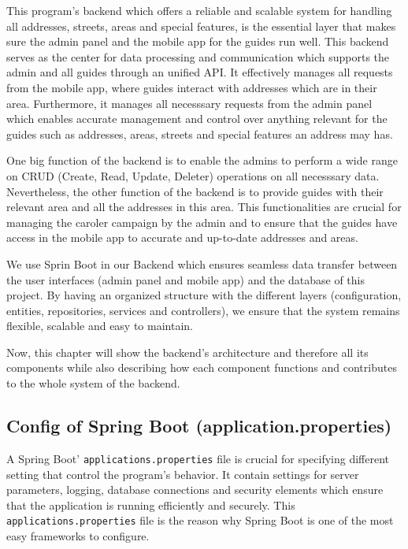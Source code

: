 \Author{\daAuthorThree}

    This program's backend which offers a reliable and scalable system for handling all addresses, streets, areas and special features, is the essential layer that makes sure the admin panel and the mobile app for the guides run well. \newline
    This backend serves as the center for data processing and communication which supports the admin and all guides through an unified API. \newline
    It effectively manages all requests from the mobile app, where guides interact with addresses which are in their area. Furthermore, it manages all necesssary requests from the admin panel which enables accurate management and control over anything relevant for the guides such as addresses, areas, streets and special features an address may has. \newline 

    One big function of the backend is to enable the admins to perform a wide range on CRUD (Create, Read, Update, Deleter) operations on all necesssary data. Nevertheless, the other function of the backend is to provide guides with their relevant area and all the addresses in this area. This functionalities are crucial for managing the caroler campaign by the admin and to ensure that the guides have access in the mobile app to accurate and up-to-date addresses and areas. \newline

    We use Sprin Boot in our Backend which ensures seamless data transfer between the user interfaces (admin panel and mobile app) and the database of this project. By having an organized structure with the different layers (configuration, entities, repositories, services and controllers), we ensure that the system remains flexible, scalable and easy to maintain. \newline 

    Now, this chapter will show the backend's architecture and therefore all its components while also describing how each component functions and contributes to the whole system of the backend.

    \subsection{Config of Spring Boot (application.properties)}
    A Spring Boot' \texttt{applications.properties} file is crucial for specifying different setting that control the program's behavior. It contain settings for server parameters, logging, database connections and security elements which ensure that the application is running efficiently and securely. This \texttt{applications.properties} file is the reason why Spring Boot is one of the most easy frameworks to configure.

